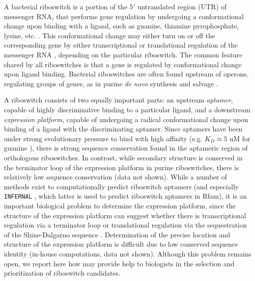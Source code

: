 A bacterial riboswitch is a portion of the $5'$
untranslated region (UTR) of messenger RNA,
that performs gene regulation by undergoing a conformational change upon
binding with a ligand, such as guanine, thiamine pyrophosphate, lysine,
etc.  \cite{breaker:Riboswitch2}.
This conformational change may either turn  on or off
the corresponding gene by either transcriptional or translational regulation
of the messenger RNA \cite{tuckerBreaker:review}, depending on the
particular riboswitch. The common feature shared by all riboswitches
is that a gene is regulated by conformational change upon ligand binding.
Bacterial riboswitches are often found upstream
of operons, regulating groups of genes, as in purine {\em de novo}
synthesis and salvage \cite{mandalBoeseBarrickWinklerBreaker}.

A riboswitch consists of two equally important parts: an upstream
{\em aptamer}, capable of highly discriminative binding to a particular
ligand, and a downstream {\em expression platform}, capable of undergoing
a radical conformational change upon binding of a ligand with the
discriminating aptamer.
Since aptamers have been under strong evolutionary pressure to
bind with high affinity
(e.g. $K_D \approx 5$ nM for guanine \cite{Mandal.nsmb04}),
there is strong
sequence conservation found in the aptameric region of orthologous
riboswitches.
In contrast, while secondary structure is conserved in the
terminator loop of the expression platform in purine riboswitches,
there is relatively low sequence conservation (data not shown).
While a number of methods exist to computationally predict
riboswitch aptamers
\cite{Bengert2004Riboswitch,Chang2009Computational,AbreuGoodger2005RibEx,Singh2009Riboswitch,Bergig.isb04}
(and especially {\tt INFERNAL} \cite{INFERNAL}, which latter is used
to predict riboswitch aptamers in Rfam), it is an important
biological problem to determine the expression platform, since the structure
of the expression platform can suggest whether there is
transcriptional regulation
via a terminator loop or translational regulation via the sequestration of
the Shine-Dalgarno sequence \cite{tuckerBreaker:review}. Determination of
the precise location and structure of the expression platform is difficult
due to low conserved sequence identity (in-house computations, data not shown).
Although this problem remains open, we report here how
\fftbor may provide help to biologists in the selection and
prioritization of riboswitch candidates.

